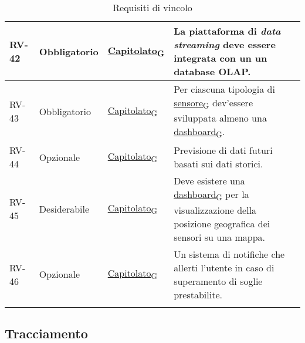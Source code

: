 \begin{longtable}{|>{\centering\arraybackslash}m{}|>{\centering\arraybackslash}m{}|>{\centering\arraybackslash}m{}|>{\centering\arraybackslash}m{}|}
	RV-42           & Obbligatorio        & \href{https://7last.github.io/docs/rtb/documentazione-interna/glossario\#capitolato}{Capitolato\textsubscript{G}} & La piattaforma di \textit{data streaming} deve essere integrata con un un database OLAP.                                                                                                                                                                                                \\\hline
	RV-43           & Obbligatorio        & \href{https://7last.github.io/docs/rtb/documentazione-interna/glossario\#capitolato}{Capitolato\textsubscript{G}} & Per ciascuna tipologia di \href{https://7last.github.io/docs/rtb/documentazione-interna/glossario\#sensore}{sensore\textsubscript{G}} dev'essere sviluppata almeno una \href{https://7last.github.io/docs/rtb/documentazione-interna/glossario\#dashboard}{dashboard\textsubscript{G}}. \\\hline
	RV-44           & Opzionale           & \href{https://7last.github.io/docs/rtb/documentazione-interna/glossario\#capitolato}{Capitolato\textsubscript{G}} & Previsione di dati futuri basati sui dati storici.                                                                                                                                                                                                                                      \\\hline
	RV-45           & Desiderabile        & \href{https://7last.github.io/docs/rtb/documentazione-interna/glossario\#capitolato}{Capitolato\textsubscript{G}} & Deve esistere una \href{https://7last.github.io/docs/rtb/documentazione-interna/glossario\#dashboard}{dashboard\textsubscript{G}} per la visualizzazione della posizione geografica dei sensori su una mappa.                                                                           \\\hline
	RV-46           & Opzionale           & \href{https://7last.github.io/docs/rtb/documentazione-interna/glossario\#capitolato}{Capitolato\textsubscript{G}} & Un sistema di notifiche che allerti l'utente in caso di superamento di soglie prestabilite.                                                                                                                                                                                             \\\hline
	\caption{Requisiti di vincolo}
	\label{table:3}
\end{longtable}


\subsection{Tracciamento}
